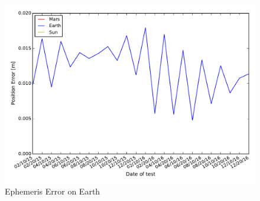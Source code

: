 \begin{figure}[htbp]
\centerline{
\includegraphics[height=0.7\textwidth, keepaspectratio]{AutoTeX/EphemEarth}}
\caption{Ephemeris Error on Earth}
\label{fig:EphemEarth}
\end{figure}